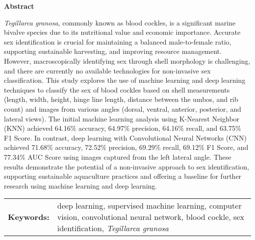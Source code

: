 \begin{center}
	\textbf{Abstract}
\end{center}
\setlength{\parindent}{0pt}
\textit{Tegillarca granosa}, commonly known as blood cockles, is a significant marine bivalve species due to its nutritional value and economic importance. Accurate sex identification is crucial for maintaining a balanced male-to-female ratio, supporting sustainable harvesting, and improving resource management. However, macroscopically identifying sex through shell morphology is challenging, and there are currently no available technologies for non-invasive sex classification. This study explores the use of machine learning and deep learning techniques to classify the sex of blood cockles based on shell measurements (length, width, height, hinge line length, distance between the umbos, and rib count) and images from various angles (dorsal, ventral, anterior, posterior, and lateral views). The initial machine learning analysis using K-Nearest Neighbor (KNN) achieved 64.16\% accuracy, 64.97\% precision, 64.16\% recall, and 63.75\% F1 Score. In contrast, deep learning with Convolutional Neural Networks (CNN) achieved 71.68\% accuracy, 72.52\% precision, 69.29\% recall, 69.12\% F1 Score, and 77.34\% AUC Score using images captured from the left lateral angle. These results demonstrate the potential of a non-invasive approach to sex identification, supporting sustainable aquaculture practices and offering a baseline for further research using machine learning and deep learning.

\begin{tabular}{lp{4.25in}}
	\hspace{-0.5em}\textbf{Keywords:}\hspace{0.25em} & deep learning, supervised machine learning, computer vision, convolutional neural network, blood cockle, sex identification, \textit{Tegillarca granosa}\\
\end{tabular}
